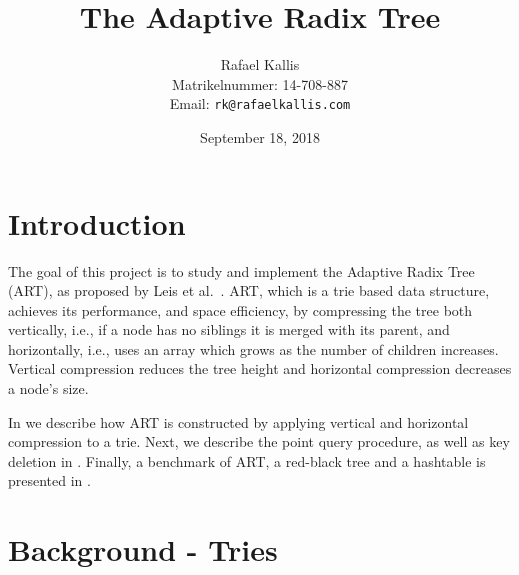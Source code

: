 \documentclass[abstracton,12pt]{scrartcl}
\title{The Adaptive Radix Tree}
\author{
    Rafael Kallis\\[-5pt]
    \scriptsize Matrikelnummer: 14-708-887\\[-5pt]
    \scriptsize Email: \texttt{rk@rafaelkallis.com}
}
\date{\vspace*{2cm}September 18, 2018}
\theoremstyle{definition}
\begin{document}
\maketitle





\newpage
\section{Introduction}


The goal of this project is to study and implement the Adaptive Radix Tree 
(ART), as proposed by Leis et al.\ \cite{leis2013adaptive}.
ART, which is a trie based data structure, achieves its performance, and space
efficiency, by compressing the tree both vertically, i.e., if a node has no 
siblings it is merged with its parent, and horizontally, i.e., uses an array
which grows as the number of children increases.
Vertical compression reduces the tree height and horizontal compression
decreases a node's size.

In  we describe how ART is constructed by applying 
vertical and horizontal compression to a trie.
Next, we describe the point query procedure, as well as 
key deletion in .
Finally, a benchmark of ART, a red-black tree and a hashtable
is presented in .

\section{Background - Tries}\label{sec:preliminaries}
\end{document}
